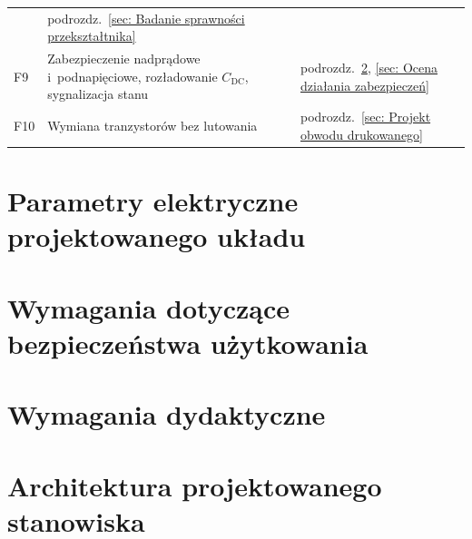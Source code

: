 \begin{table}[htb]
\begin{tabular}{@{}C{10mm} L{80mm} L{55mm}@{}}
        & podrozdz.~\ref{sec: Badanie sprawności przekształtnika} \\
    F9  & Zabezpieczenie nadprądowe i~podnapięciowe, rozładowanie
          $C_\mathrm{DC}$, sygnalizacja stanu
        & podrozdz.~\ref{sec: Wymagania dotyczące bezpieczeństwa użytkowania},
          \ref{sec: Ocena działania zabezpieczeń} \\
    F10 & Wymiana tranzystorów bez lutowania
        & podrozdz.~\ref{sec: Projekt obwodu drukowanego} \\
    \bottomrule
  \end{tabular}
\end{table}


\section{Parametry elektryczne projektowanego układu}
\label{sec: Parametry elektryczne projektowanego układu}

\section{Wymagania dotyczące bezpieczeństwa użytkowania}
\label{sec: Wymagania dotyczące bezpieczeństwa użytkowania}

\section{Wymagania dydaktyczne}
\label{sec: Wymagania dydaktyczne}

\section{Architektura projektowanego stanowiska}
\label{sec: Architektura projektowanego stanowiska}
